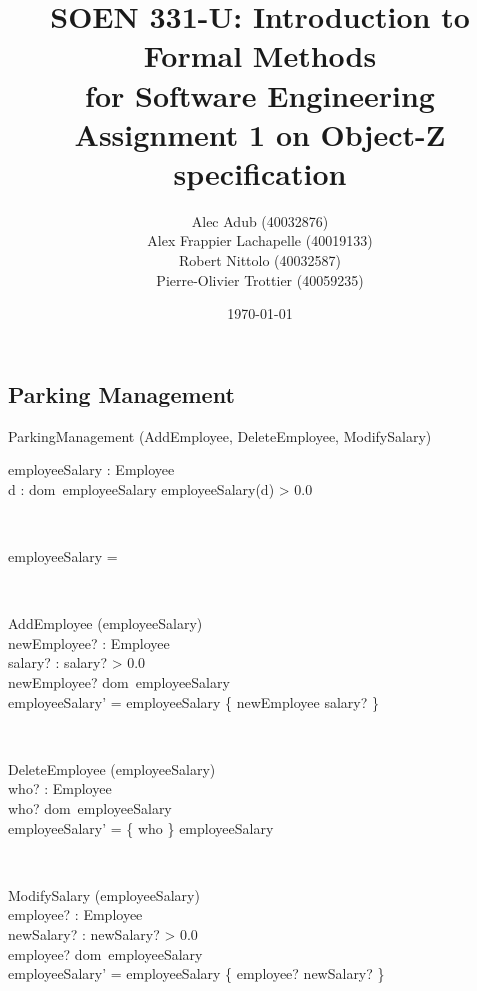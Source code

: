 \documentclass[12pt]{article}
\title{SOEN 331-U: Introduction to Formal Methods\\for Software Engineering\\
Assignment 1 on Object-Z specification}
\author{\begin{tabular}{c}
Alec Adub (40032876) \tabularnewline
Alex Frappier Lachapelle (40019133) \tabularnewline
Robert Nittolo (40032587) \tabularnewline
Pierre-Olivier Trottier (40059235) \tabularnewline\\
\end{tabular}
}
\date{\today}
\begin{document}
\begin{spacing}{1.5}

\maketitle

\newpage

\section{Parking Management}

\begin{class}{ParkingManagement}
\also
\upharpoonright (AddEmployee, DeleteEmployee, ModifySalary) \\
\begin{state}
employeeSalary : Employee \pfun {}\\
\where
\forall d : dom~employeeSalary \bullet employeeSalary(d) > 0.0
\end{state} \\
\begin{init}
employeeSalary = \emptyset %
\end{init} \\
\begin{op}{AddEmployee}
\Delta (employeeSalary) \\
newEmployee? : Employee\\
salary? : 
\ST
salary? > 0.0 \\
newEmployee? \notin dom~employeeSalary\\
employeeSalary' = employeeSalary \cup \{ newEmployee \mapsto salary? \}
\end{op}\\
\begin{op}{DeleteEmployee}
\Delta (employeeSalary) \\
who? : Employee\\
\ST
who? \in dom~employeeSalary\\
employeeSalary' = \{ who \} \ndres employeeSalary
\end{op}\\
\begin{op}{ModifySalary}
\Delta (employeeSalary) \\
employee? : Employee\\
newSalary? : 
\ST
newSalary? > 0.0 \\
employee? \in dom~employeeSalary\\
employeeSalary' = employeeSalary \oplus \{ employee? \mapsto newSalary? \}
\end{op}\\
\end{class}


\end{spacing}
\end{document}

